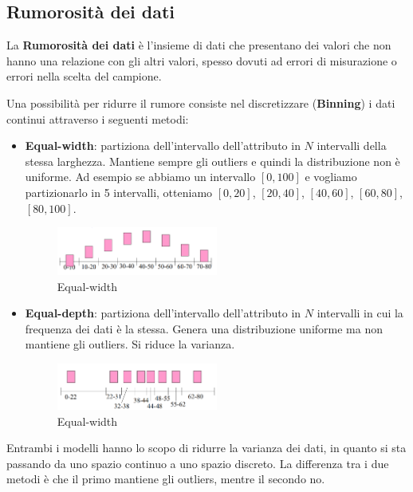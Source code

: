 \subsection{Rumorosità dei dati}
\begin{definizione} 
      La \textbf{Rumorosità dei dati} è l'insieme di dati che presentano dei
      valori che non hanno una relazione con gli altri valori, spesso dovuti ad
      errori di misurazione o errori nella scelta del campione.
\end{definizione}
Una possibilità per ridurre il rumore consiste nel discretizzare (\textbf{Binning})
i dati continui attraverso i seguenti metodi:
\begin{itemize}
      \item \textbf{Equal-width}: partiziona dell'intervallo dell'attributo in $N$
            intervalli della stessa larghezza. Mantiene sempre gli outliers e
            quindi la distribuzione non è uniforme.
            Ad esempio se abbiamo un intervallo $[0, 100]$ e vogliamo partizionarlo
            in 5 intervalli, otteniamo $[0, 20]$, $[20, 40]$, $[40, 60]$, $[60, 80]$,
            $[80, 100]$.
            \begin{figure}[!ht]
                  \centering
                  \includegraphics[width=0.5\textwidth]{./img/Preprocessing/equalwidth.png}
                  \caption{Equal-width}
                  \label{fig:equal-width}
            \end{figure}
      \item \textbf{Equal-depth}: partiziona dell'intervallo dell'attributo in $N$
            intervalli in cui la frequenza dei dati è la stessa. Genera una
            distribuzione uniforme ma non mantiene gli outliers. Si riduce la
            varianza.
            \begin{figure}[!ht]
                  \centering
                  \includegraphics[width=0.5\textwidth]{./img/Preprocessing/equaldepth.png}
                  \caption{Equal-width}
                  \label{fig:equal-width}
            \end{figure}
\end{itemize}
Entrambi i modelli hanno lo scopo di ridurre la varianza dei dati, in quanto si
sta passando da uno spazio continuo a uno spazio discreto. La differenza tra i
due metodi è che il primo mantiene gli outliers, mentre il secondo no.
